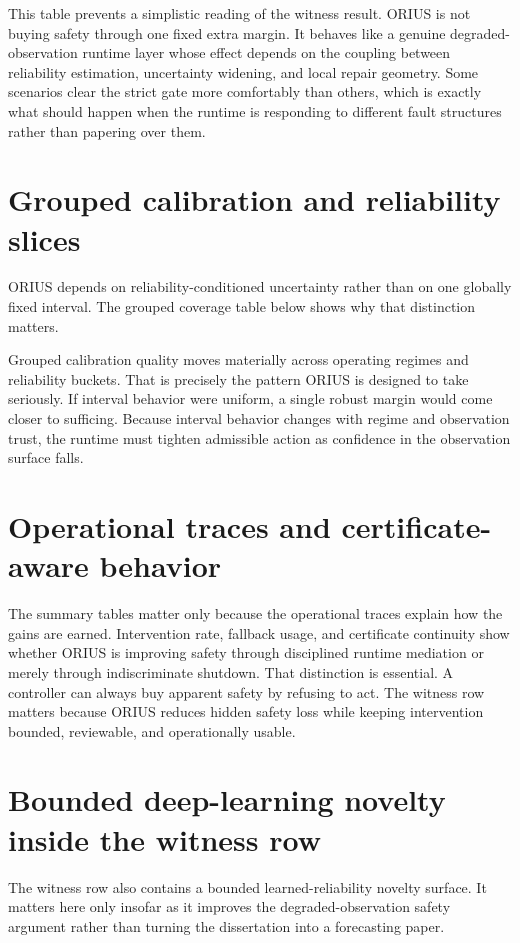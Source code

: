 This table prevents a simplistic reading of the witness result. ORIUS is not buying safety
through one fixed extra margin. It behaves like a genuine degraded-observation runtime layer
whose effect depends on the coupling between reliability estimation, uncertainty widening,
and local repair geometry. Some scenarios clear the strict gate more comfortably than
others, which is exactly what should happen when the runtime is responding to different
fault structures rather than papering over them.

\section{Grouped calibration and reliability slices}
ORIUS depends on reliability-conditioned uncertainty rather than on one globally fixed
interval. The grouped coverage table below shows why that distinction matters.


Grouped calibration quality moves materially across operating regimes and reliability buckets. That is
precisely the pattern ORIUS is designed to take seriously. If interval behavior were
uniform, a single robust margin would come closer to sufficing. Because interval behavior
changes with regime and observation trust, the runtime must tighten admissible action as
confidence in the observation surface falls.

\section{Operational traces and certificate-aware behavior}
The summary tables matter only because the operational traces explain how the gains are
earned. Intervention rate, fallback usage, and certificate continuity show whether ORIUS is
improving safety through disciplined runtime mediation or merely through indiscriminate
shutdown. That distinction is essential. A controller can always buy apparent safety by
refusing to act. The witness row matters because ORIUS reduces hidden safety loss while
keeping intervention bounded, reviewable, and operationally usable.

\section{Bounded deep-learning novelty inside the witness row}
The witness row also contains a bounded learned-reliability novelty surface. It matters here
only insofar as it improves the degraded-observation safety argument rather than turning the
dissertation into a forecasting paper.


